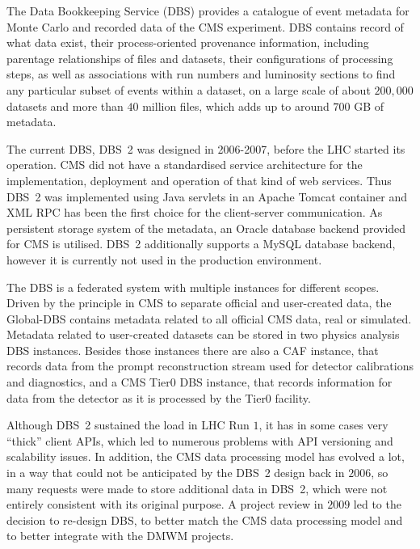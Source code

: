 The Data Bookkeeping Service (DBS) \cite{DBS} provides a catalogue of event metadata for Monte Carlo and recorded data of the CMS experiment. DBS contains record of what data exist, their process-oriented provenance information, including parentage relationships of files and datasets, their configurations of processing steps, as well as associations with run numbers and luminosity sections to find any particular subset of events within a dataset, on a large scale of about $200,000$ datasets and more than $40$ million files, which adds up to around $700$ GB of metadata.

The current DBS, DBS~2 \cite{DBS2} was designed in 2006-2007, before the LHC started its operation. CMS did not have a standardised service architecture for the implementation, deployment and operation of that kind of web services. Thus DBS~2 was implemented using Java servlets in an Apache Tomcat container and XML RPC has been the first choice for the client-server communication. As  persistent storage system of the metadata, an Oracle database backend provided for CMS \cite{CMSDBs} is utilised. DBS~2 additionally supports a MySQL database backend, however it is currently not used in the production environment.

The DBS is a federated system with multiple instances for different scopes. Driven by the principle in CMS to separate official and user-created data, the Global-DBS contains metadata related to all official CMS data, real or simulated. Metadata related to user-created datasets can be stored in two physics analysis DBS instances. Besides those instances there are also a CAF instance, that records data from the prompt reconstruction stream used for detector calibrations and diagnostics, and a CMS Tier0 DBS instance, that records information for data from the detector as it is processed by the Tier0 facility.

Although DBS~2 sustained the load in LHC Run $1$, it has in some cases very ``thick'' client APIs, which  led to numerous problems with API versioning and scalability issues. In addition, the CMS data processing model has evolved a lot, in a way that could not be anticipated by the DBS~2 design back in $2006$, so many requests were made to store additional data in DBS~2, which were not entirely consistent with its original purpose. A project review in $2009$ led to the decision to re-design DBS, to better match the CMS data processing model and to better integrate with the DMWM projects.

